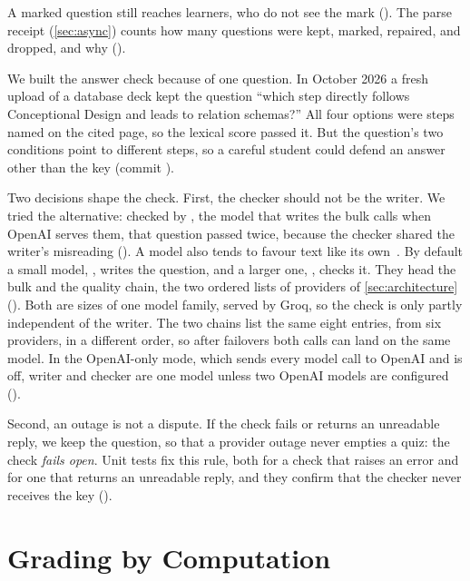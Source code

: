 A marked question still reaches learners, who do not see the mark
(). The parse receipt
(\cref{sec:async}) counts how many questions were
kept, marked, repaired, and dropped, and why
().

We built the answer check because of one question. In October 2026 a fresh
upload of a database deck kept the question \enquote{which step directly
follows Conceptional Design and leads to relation schemas?} All four options
were steps named on the cited page, so the lexical score passed it. But the
question's two conditions point to different steps, so a careful student could
defend an answer other than the key (commit ).

Two decisions shape the check. First, the checker should not be the writer.
We tried the alternative: checked by , the model that writes
the bulk calls when OpenAI serves them, that question passed twice, because
the checker shared the writer's misreading
(). A model also tends to favour
text like its own~\cite{panickssery2024selfpreference}. By default a small
model, , writes the question, and a larger one,
, checks it. They head the bulk and the quality chain, the
two ordered lists of providers of \cref{sec:architecture}
(). Both are sizes of one model family,
served by Groq, so the check is only partly independent of the writer. The two
chains list the same eight entries, from six providers, in a different order, so after failovers
both calls can land on the same model. In the OpenAI-only mode, which sends every model call to OpenAI and is off,
writer and checker are one model unless two OpenAI models are configured
().

Second, an outage is not a dispute. If the check fails or returns an
unreadable reply, we keep the question, so that a provider outage never
empties a quiz: the check \emph{fails open}. Unit tests fix this rule, both for
a check that raises an error and for one that returns an unreadable reply, and
they confirm that the checker never receives the key
().

\section{Grading by Computation}
\label{sec:c6-grading}

